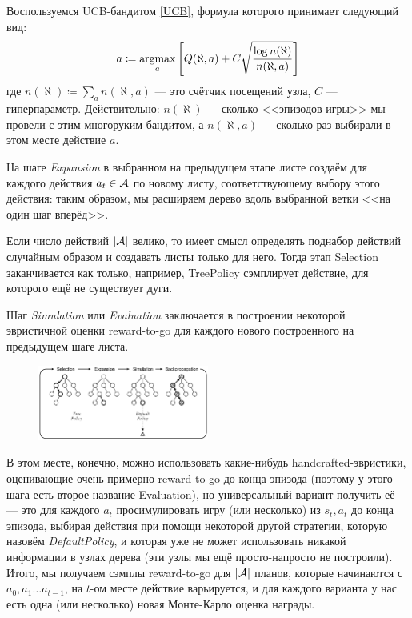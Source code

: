\begin{example} Воспользуемся UCB-бандитом \eqref{UCB}, формула которого принимает следующий вид:
$$a \coloneqq \mathop{\mathrm{argmax}}_a \left[ Q(\aleph, a) + C \sqrt{\frac{\log n(\aleph)}{n(\aleph, a)}}\right]$$
где $n(\aleph) \coloneqq \sum\limits_a n(\aleph, a)$ --- это счётчик посещений узла, $C$ --- гиперпараметр. Действительно: $n(\aleph)$ --- сколько <<эпизодов игры>> мы провели с этим многоруким бандитом, а $n(\aleph, a)$ --- сколько раз выбирали в этом месте действие $a$. 
\end{example}

\begin{definition}
    На шаге \emph{Expansion} в выбранном на предыдущем этапе листе создаём для каждого действия $a_t \HM\in \A$ по новому листу, соответствующему выбору этого действия: таким образом, мы расширяем дерево вдоль выбранной ветки <<на один шаг вперёд>>.
\end{definition}

\begin{remark}
Если число действий $|\mathcal{A}|$ велико, то имеет смысл определять поднабор действий случайным образом и создавать листы только для него. Тогда этап Selection заканчивается как только, например, TreePolicy сэмплирует действие, для которого ещё не существует дуги.
\end{remark}

\begin{definition}
    Шаг \emph{Simulation} или \emph{Evaluation} заключается в построении некоторой эвристичной оценки reward-to-go для каждого нового построенного на предыдущем шаге листа.
\end{definition}

\begin{figure}
\vspace{-0.3cm}
\centering
\includegraphics[width=0.5\textwidth]{Images/MCTS.png}
\vspace{-0.3cm}
\end{figure}

В этом месте, конечно, можно использовать какие-нибудь handcrafted-эвристики, оценивающие очень примерно reward-to-go до конца эпизода (поэтому у этого шага есть второе название Evaluation), но универсальный вариант получить её --- это для каждого $a_t$ просимулировать игру (или несколько) из $s_t, a_t$ до конца эпизода, выбирая действия при помощи некоторой другой стратегии, которую назовём \emph{DefaultPolicy}, и которая уже не может использовать никакой информации в узлах дерева (эти узлы мы ещё просто-напросто не построили). Итого, мы получаем сэмплы reward-to-go для $|\mathcal{A}|$ планов, которые начинаются с $a_0, a_1 \dots a_{t-1}$, на $t$-ом месте действие варьируется, и для каждого варианта у нас есть одна (или несколько) новая Монте-Карло оценка награды.

